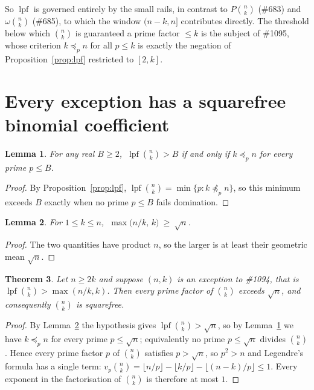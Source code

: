 \documentclass[11pt]{article}
\newtheorem{theorem}{Theorem}
\newtheorem{lemma}[theorem]{Lemma}
\DeclareMathOperator{\lpf}{lpf}
\begin{document}
So $\lpf$ is governed entirely by the small rails, in contrast to $P\binom nk$ (\#683) and
$\omega\binom nk$ (\#685), to which the window $(n-k,n]$ contributes directly.  The threshold
below which $\binom nk$ is guaranteed a prime factor $\le k$ is the subject of \#1095, whose
criterion $k\preceq_p n$ for all $p\le k$ is exactly the negation of
Proposition~\ref{prop:lpf} restricted to $[2,k]$.

\section{Every exception has a squarefree binomial coefficient}

\begin{lemma}\label{lem:thresh}
For any real $B\ge2$, $\ \lpf\binom nk>B$ if and only if $k\preceq_p n$ for every prime
$p\le B$.
\end{lemma}

\begin{proof}
By Proposition~\ref{prop:lpf}, $\lpf\binom nk=\min\{p:k\not\preceq_p n\}$, so this minimum
exceeds $B$ exactly when no prime $p\le B$ fails domination.
\end{proof}

\begin{lemma}\label{lem:amgm}
For $1\le k\le n$, $\ \max\bigl(n/k,\,k\bigr)\ \ge\ \sqrt n$.
\end{lemma}

\begin{proof}
The two quantities have product $n$, so the larger is at least their geometric mean
$\sqrt n$.
\end{proof}

\begin{theorem}\label{thm:sqfree}
Let $n\ge2k$ and suppose $(n,k)$ is an exception to \textup{\#1094}, that is
$\lpf\binom nk>\max(n/k,k)$.  Then every prime factor of $\binom nk$ exceeds $\sqrt n$, and
consequently $\binom nk$ is squarefree.
\end{theorem}

\begin{proof}
By Lemma~\ref{lem:amgm} the hypothesis gives $\lpf\binom nk>\sqrt n$, so by
Lemma~\ref{lem:thresh} we have $k\preceq_p n$ for every prime $p\le\sqrt n$; equivalently no
prime $p\le\sqrt n$ divides $\binom nk$.  Hence every prime factor $p$ of $\binom nk$
satisfies $p>\sqrt n$, so $p^{2}>n$ and Legendre's formula has a single term:
$v_p\binom nk=\lfloor n/p\rfloor-\lfloor k/p\rfloor-\lfloor (n-k)/p\rfloor\le1$.
Every exponent in the factorisation of $\binom nk$ is therefore at most $1$.
\end{proof}
\end{document}
